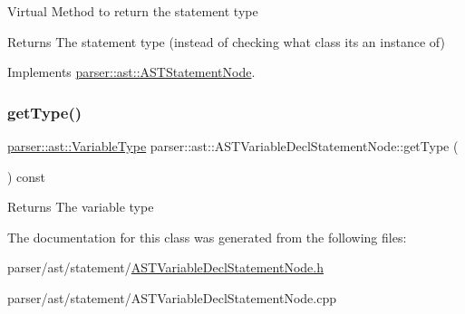 Virtual Method to return the statement type \begin{DoxyReturn}{Returns}
The statement type (instead of checking what class it\textquotesingle{}s an instance of) 
\end{DoxyReturn}


Implements \hyperlink{classparser_1_1ast_1_1ASTStatementNode_ac381d35d12f774a1bab0e209c5bfec1f}{parser\+::ast\+::\+A\+S\+T\+Statement\+Node}.

\mbox{\label{classparser_1_1ast_1_1ASTVariableDeclStatementNode_a5f26584b63fff33a9bc55c595ab1d3ab}} 
\subsubsection{\texorpdfstring{get\+Type()}{getType()}}
{\footnotesize\ttfamily \hyperlink{ASTVariableDeclStatementNode_8h_a1e8e1bde0729627e3a22ffa858d5f3b9}{parser\+::ast\+::\+Variable\+Type} parser\+::ast\+::\+A\+S\+T\+Variable\+Decl\+Statement\+Node\+::get\+Type (\begin{DoxyParamCaption}{ }\end{DoxyParamCaption}) const}

\begin{DoxyReturn}{Returns}
The variable type 
\end{DoxyReturn}


The documentation for this class was generated from the following files\+:\begin{DoxyCompactItemize}
\item 
parser/ast/statement/\hyperlink{ASTVariableDeclStatementNode_8h}{A\+S\+T\+Variable\+Decl\+Statement\+Node.\+h}\item 
parser/ast/statement/A\+S\+T\+Variable\+Decl\+Statement\+Node.\+cpp\end{DoxyCompactItemize}
